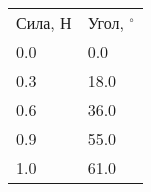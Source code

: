 \begin{tabular}{ll}
\hline
 Сила, Н & Угол, $^\circ$ \\
 0.0     & 0.0            \\
 0.3     & 18.0           \\
 0.6     & 36.0           \\
 0.9     & 55.0           \\
 1.0     & 61.0           \\
\hline
\end{tabular}